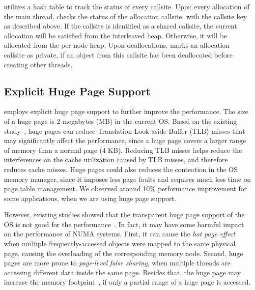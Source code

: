 
\NA{} utilizes a hash table to track the status of every callsite. Upon every allocation of the main thread, \NA{} checks the status of the allocation callsite, with the callsite key as described above. If the callsite is identified as a shared callsite, the current allocation will be satisfied from the interleaved heap. Otherwise, it will be allocated from the per-node heap. Upon deallocations, \NM{} marks an allocation callsite as private, if an object from this callsite has been deallocated before creating other threads. 


\subsection{Explicit Huge Page Support} 
\label{sec:hugepage}
\NA{} employs explicit huge page support to further improve the performance. The size of a huge page is 2 megabytes (MB) in the current OS. Based on the existing study~\cite{hugepages}, huge pages can reduce Translation Look-aside Buffer (TLB) misses that may significantly affect the performance, since a huge page covers a larger range of memory than a normal page (4 KB). Reducing TLB misses helps reduce the interferences on the cache utilization caused by TLB misses, and therefore reduces cache misses. Huge pages could also reduces the contention in the OS memory manager, since it imposes less page faults and requires much less time on page table management. We observed around 10\% performance improvement for some applications, when we are using huge page support. 

However, existing studies showed that the transparent huge page support of the OS is not good for the performance~\cite{Gaud:2014:LPM:2643634.2643659, DBLP:conf/asplos/PanwarBG19}. In fact, it may have some harmful impact on the performance of NUMA systems. First, it can cause the \textit{hot page effect} when multiple frequently-accessed objects were  mapped  to  the  same  physical  page, causing the overloading of the corresponding memory node. Second, huge pages are more prone to \textit{page-level false sharing}, when multiple threads are accessing different data inside the same page. Besides that, the huge page may increase the memory footprint~\cite{DBLP:conf/asplos/MaasAIJMR20}, if only a partial range of a huge page is accessed. 

